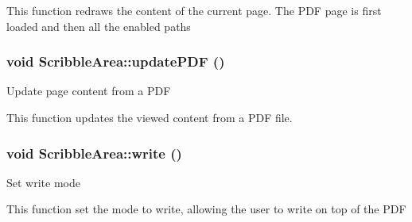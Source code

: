 This function redraws the content of the current page. The PDF page is first loaded and then all the enabled paths \hypertarget{classScribbleArea_a4d7448dd926c6fdb7bf1912b81d667e8}{
\subsubsection[{updatePDF}]{\setlength{\rightskip}{0pt plus 5cm}void ScribbleArea::updatePDF ()}}
\label{classScribbleArea_a4d7448dd926c6fdb7bf1912b81d667e8}
Update page content from a PDF

This function updates the viewed content from a PDF file. \hypertarget{classScribbleArea_ad50fa04c77c2caea001b5a08799174fc}{
\subsubsection[{write}]{\setlength{\rightskip}{0pt plus 5cm}void ScribbleArea::write ()}}
\label{classScribbleArea_ad50fa04c77c2caea001b5a08799174fc}
Set write mode

This function set the mode to write, allowing the user to write on top of the PDF 

